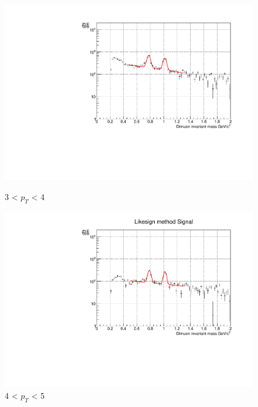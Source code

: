 \begin{figure}[H]
\begin{minipage}{0.45\textwidth}
                    \end{minipage}
                    \\
                    \vspace{1em}
                    \begin{minipage}{0.45\textwidth}
                        \centering
                        \includegraphics[width=\textwidth]{fig/3_4_2_fit_pt_3to4.pdf}
                        \captionsetup{labelformat=empty}
                        \caption*{3 < $p_{T}$ < 4}
                    \end{minipage}
                    \hfill
                    \begin{minipage}{0.45\textwidth}
                        \centering
                        \includegraphics[width=\textwidth]{fig/3_4_2_fit_pt_4to5.pdf}
                        \captionsetup{labelformat=empty}
                        \caption*{4 < $p_{T}$ < 5} 
    

\end{minipage}
\end{figure}
